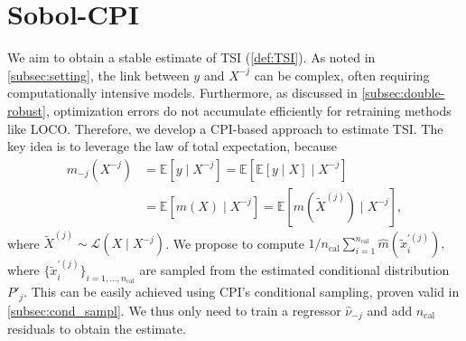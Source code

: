 \documentclass{article}
\theoremstyle{plain}
\theoremstyle{definition}
\theoremstyle{remark}
\newcommand{\e}[1]{\mathbb{E}\left[#1\right]  } %
\begin{document}
\section{Sobol-CPI}\label{sect:sobol-CPI}
%
We aim to obtain a stable estimate of TSI (\ref{def:TSI}). As noted in \cref{subsec:setting}, the link between $y$ and $X^{-j}$ can be complex, often requiring computationally intensive models. Furthermore, as discussed in \cref{subsec:double-robust}, optimization errors do not accumulate efficiently for retraining methods like LOCO. Therefore, we develop a CPI-based approach to estimate TSI. The key idea is to leverage the law of total expectation, because
\begin{align*}
    m_{-j}(X^{-j})&=\e{y\mid X^{-j}}=\e{\e{y\mid X}\mid X^{-j}}\\&=\e{m(X)\mid X^{-j}}=\e{m(\widetilde{X}^{(j)})\mid X^{-j}},
\end{align*}
 where $\widetilde{X}^{(j)}\sim \mathcal{L}(X\mid X^{-j})$.
 We propose to compute
$
1/n_\mathrm{cal} \sum_{i=1}^{n_\mathrm{cal}} \widehat{m}\left( \widetilde{x}^{'(j)}_i \right),
$
where $\{\widetilde{x}^{'(j)}_i\}_{i=1, \dots, n_\mathrm{cal}}$ are sampled from the estimated conditional distribution $P'_j$. This can be easily achieved using CPI's conditional sampling, proven valid in \cref{subsec:cond_sampl}. We thus only need to train a regressor $\widehat{\nu}_{-j}$ and add $n_\mathrm{cal}$ residuals to obtain the estimate.
\end{document}
